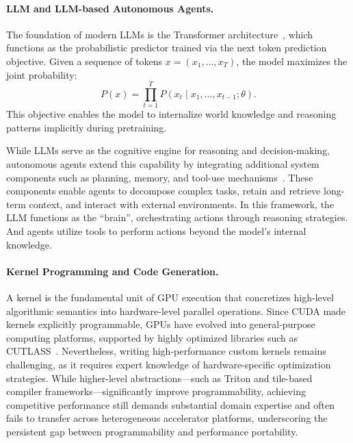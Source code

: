 

\paragraph{LLM and LLM-based Autonomous Agents.} The foundation of modern LLMs is the Transformer architecture~\cite{vaswani2017attention}, which functions as the probabilistic predictor trained via the next token prediction objective. Given a sequence of tokens $x = (x_1, \dots, x_T)$, the model maximizes the joint probability:
$$
P(x) = \prod_{t=1}^{T} P(x_t \mid x_{1}, \dots, x_{t-1}; \theta).
$$
This objective enables the model to internalize world knowledge and reasoning patterns implicitly during pretraining.


While LLMs serve as the cognitive engine for reasoning and decision-making, autonomous agents extend this capability by integrating additional system components such as planning, memory, and tool-use mechanisms~\cite{wang2024survey}. These components enable agents to decompose complex tasks, retain and retrieve long-term context, and interact with external environments. In this framework, the LLM functions as the ``brain'', orchestrating actions through reasoning strategies. And agents utilize tools to perform actions beyond the model's internal knowledge.


\paragraph{Kernel Programming and Code Generation.} 
A kernel is the fundamental unit of GPU execution that concretizes high-level algorithmic semantics into hardware-level parallel operations. Since CUDA made kernels explicitly programmable, GPUs have evolved into general-purpose computing platforms, supported by highly optimized libraries such as CUTLASS~\cite{nvidia2017cutlass}. Nevertheless, writing high-performance custom kernels remains challenging, as it requires expert knowledge of hardware-specific optimization strategies. While higher-level abstractions—such as Triton and tile-based compiler frameworks—significantly improve programmability, achieving competitive performance still demands substantial domain expertise and often fails to transfer across heterogeneous accelerator platforms, underscoring the persistent gap between programmability and performance portability.


